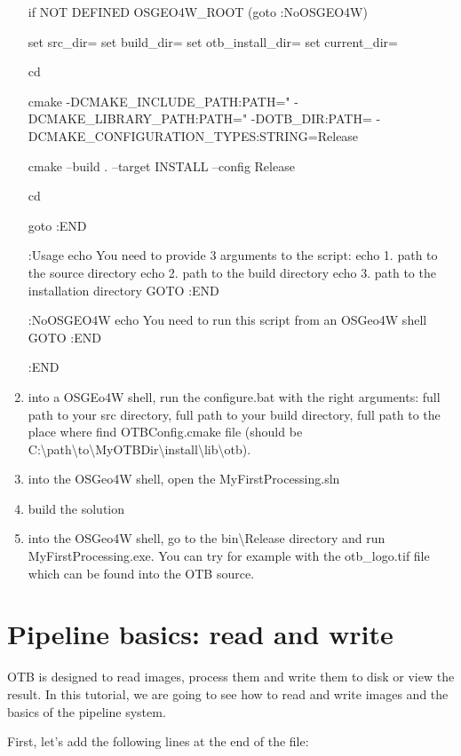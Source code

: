 \begin{enumerate}
\begin{batcode}
if NOT DEFINED OSGEO4W_ROOT (goto :NoOSGEO4W)
	
set src_dir=%
set build_dir=%
set otb_install_dir=%
set current_dir=%

cd %

cmake %
      -DCMAKE_INCLUDE_PATH:PATH="%
      -DCMAKE_LIBRARY_PATH:PATH="%
      -DOTB_DIR:PATH=%
      -DCMAKE_CONFIGURATION_TYPES:STRING=Release

cmake --build . --target INSTALL --config Release

cd %

goto :END

:Usage
echo You need to provide 3 arguments to the script: 
echo   1. path to the source directory
echo   2. path to the build directory
echo   3. path to the installation directory 
GOTO :END

:NoOSGEO4W
echo You need to run this script from an OSGeo4W shell
GOTO :END

:END
\end{batcode}
\item into a OSGEo4W shell, run the configure.bat with the right arguments: full path to your src directory, full path to your build directory, full path to the place where find OTBConfig.cmake file (should be C:\textbackslash path\textbackslash to\textbackslash MyOTBDir\textbackslash install\textbackslash lib\textbackslash otb).
\item into the OSGeo4W shell, open the MyFirstProcessing.sln
\item build the solution
\item into the OSGeo4W shell, go to the bin\textbackslash Release directory and run MyFirstProcessing.exe. You can try for example with the otb\_logo.tif file which can be found into the OTB source.
\end{enumerate}

\section{Pipeline basics: read and write}
\label{sec:TutorialPipeline}


OTB is designed to read images, process them and write them to disk or
view the result. In this tutorial, we are going to see how to read and
write images and the basics of the pipeline system.

First, let's add the following lines at the end of the 
file:

